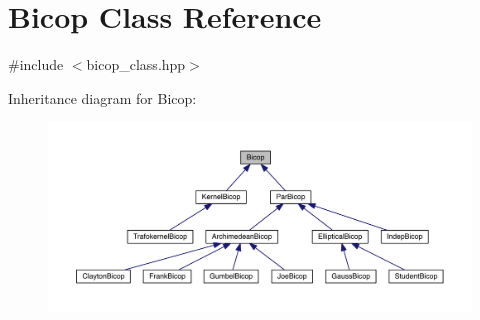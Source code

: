 \hypertarget{class_bicop}{}\section{Bicop Class Reference}
\label{class_bicop}


{\ttfamily \#include $<$bicop\+\_\+class.\+hpp$>$}



Inheritance diagram for Bicop\+:
\nopagebreak
\begin{figure}[H]
\begin{center}
\leavevmode
\includegraphics[width=350pt]{class_bicop__inherit__graph}
\end{center}
\end{figure}
